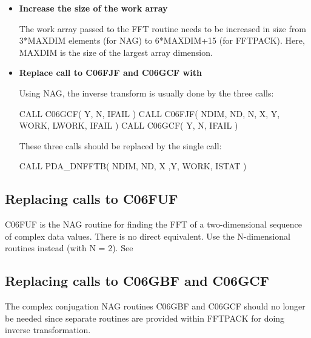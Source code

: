 \documentclass[11pt,twoside,nolof]{starlink}
\begin{document}
\begin{itemize}

\item\textbf{Increase the size of the work array}

   The work array passed to the FFT routine needs to be increased in
   size from 3*MAXDIM elements (for NAG) to 6*MAXDIM+15 (for FFTPACK).
   Here, MAXDIM is the size of the largest array dimension.

\item\textbf{Replace call to C06FJF and C06GCF with
}

   Using NAG, the inverse transform is usually done by the three calls:

\begin{terminalv}
      CALL C06GCF( Y, N, IFAIL )
      CALL C06FJF( NDIM, ND, N, X, Y, WORK, LWORK, IFAIL )
      CALL C06GCF( Y, N, IFAIL )
\end{terminalv}

   These three calls should be replaced by the single call:

\begin{terminalv}
      CALL PDA_DNFFTB( NDIM, ND, X ,Y, WORK, ISTAT )
\end{terminalv}

\end{itemize}


\subsection{Replacing calls to C06FUF}

   C06FUF is the NAG routine for finding the FFT of a two-dimensional
   sequence of complex data values. There is no direct equivalent. Use
   the N-dimensional routines instead (with N = 2). See


\subsection{Replacing calls to C06GBF and C06GCF}

   The complex conjugation NAG routines C06GBF and C06GCF should no
   longer be needed since separate routines are provided within FFTPACK
   for doing inverse transformation.
\end{document}
